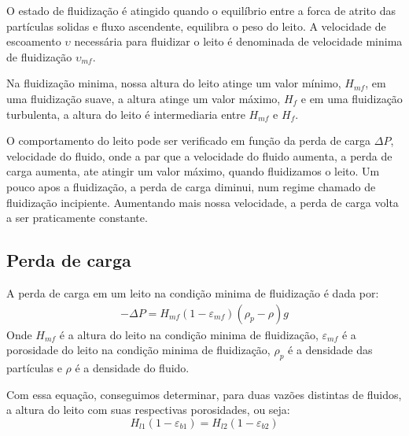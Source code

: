 O estado de fluidização é atingido quando o equilíbrio entre a forca de atrito das partículas
solidas e fluxo ascendente, equilibra o peso do leito. A velocidade de escoamento \(\upsilon \)
necessária para fluidizar o leito é denominada de velocidade minima de fluidização \(\upsilon _{mf}\). \par

Na fluidização minima, nossa altura do leito atinge um valor mínimo, \(H_{mf}\), em uma fluidização
suave, a altura atinge um valor máximo, \(H_{f} \) e em uma fluidização turbulenta, a altura do
leito é intermediaria entre \(H_{mf} \) e \(H_{f} \). \par

O comportamento do leito pode ser verificado em função da perda de carga \(\Delta P\), velocidade do
fluido, onde a par que a velocidade do fluido aumenta, a perda de carga aumenta, ate atingir um
valor máximo, quando fluidizamos o leito. Um pouco apos a fluidização, a perda de carga diminui, num
regime chamado de fluidização incipiente. Aumentando mais nossa velocidade, a perda de carga volta a
ser praticamente constante. \par

\subsection{Perda de carga}
A perda de carga em um leito na condição minima de fluidização é dada por:
\begin{align}
    -\Delta P = H_{mf} \left( 1 - \varepsilon_{mf} \right) \left( \rho _{p} - \rho  \right) g
\end{align}
Onde \(H_{mf}\) é a altura do leito na condição minima de fluidização, \(\varepsilon_{mf}\) é a
porosidade do leito na condição minima de fluidização, \(\rho _{p}\) é a densidade das partículas e
\(\rho \) é a densidade do fluido. \par

Com essa equação, conseguimos determinar, para duas vazões distintas de fluidos, a altura do leito
com suas respectivas porosidades, ou seja:
\begin{equation}
    H_{l1} \left( 1 - \varepsilon_{b1} \right) = H_{l2} \left( 1 - \varepsilon_{b2} \right)   
\end{equation}
